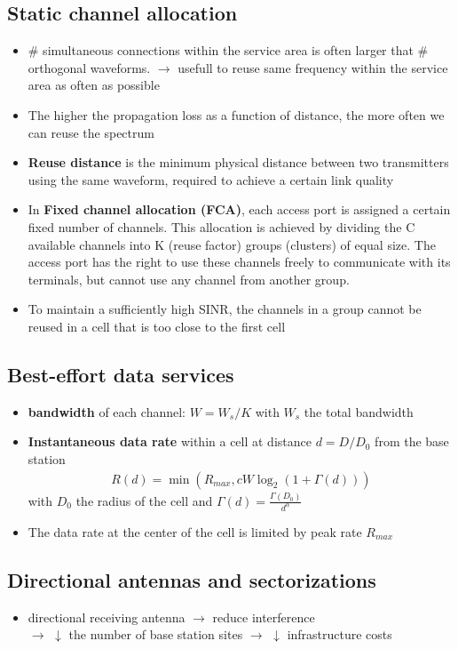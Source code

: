\subsection{Static channel allocation}
\begin{itemize}
	\item \# simultaneous connections within the service area is often larger that \# orthogonal waveforms. $\rightarrow$ usefull to reuse same frequency within the service area as often as possible
	\item The higher the propagation loss as a function of distance, the more often we can reuse the spectrum
	\item \textbf{Reuse distance} is the minimum physical distance between two transmitters using the same waveform, required to achieve a certain link quality
	\item In \textbf{Fixed channel allocation (FCA)}, each access port is assigned a certain fixed number of channels. This allocation is achieved by dividing the C available channels into K (reuse factor) groups (clusters) of equal size. The access port has the right to use these channels freely to communicate with its terminals, but cannot use any channel from another group.
	\item To maintain a sufficiently high SINR, the channels in a group cannot be reused in a cell that is too close to the first cell
\end{itemize}
\subsection{Best-effort data services}
\begin{itemize}
	\item \textbf{bandwidth} of each channel: $W = W_s/K$
	with $W_s$ the total bandwidth
	\item \textbf{Instantaneous data rate} within a cell at distance $d = D/D_0$ from the base station
	\begin{align*}
	 	R(d) = \min(R_{max}, cW\log_2(1 + \Gamma(d)))
	 \end{align*} 
	 with $D_0$ the radius of the cell and $\Gamma(d) = \frac{\Gamma(D_0)}{d^{\alpha}}$
	 \item The data rate at the center of the cell is limited by peak rate $R_{max}$
\end{itemize}
\subsection{Directional antennas and sectorizations}
\begin{itemize}
	\item directional receiving antenna $\rightarrow$ reduce interference \\
	$\rightarrow$ $\downarrow$ the number of base station sites $\rightarrow$ $\downarrow$ infrastructure costs
\end{itemize}
